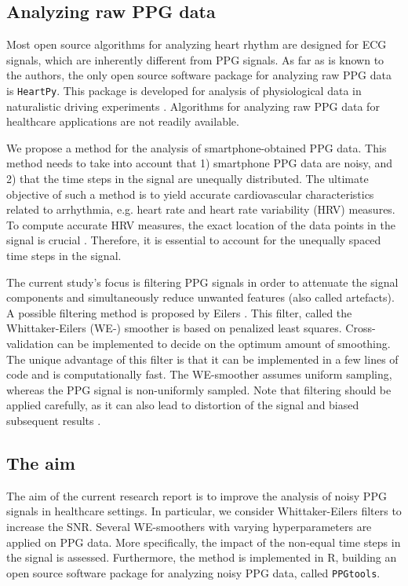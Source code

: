 \documentclass[twocolumn]{bmcart}%
\begin{document}
\subsection*{Analyzing raw PPG data}
Most open source algorithms for analyzing heart rhythm are designed for ECG signals, which are inherently different from PPG signals. 
As far as is known to the authors, the only open source software package for analyzing raw PPG data is \texttt{HeartPy}. 
This package is developed for analysis of physiological data in naturalistic driving experiments \cite{vanGent2019}. 
Algorithms for analyzing raw PPG data for healthcare applications are not readily available. 

We propose a method for the analysis of smartphone-obtained PPG data. 
This method needs to take into account that 1) smartphone PPG data are noisy,
and 2) that the time steps in the signal are unequally distributed. 
The ultimate objective of such a method is to yield accurate cardiovascular characteristics related to arrhythmia, e.g. heart rate and heart rate variability (HRV) measures.  
To compute accurate HRV measures, the exact location of the data points in the signal is crucial \cite{GarciaMartinez2017}.  
Therefore, it is essential to account for the unequally spaced time steps in the signal. 

The current study's focus is filtering PPG signals in order to attenuate the signal components and simultaneously reduce unwanted features (also called artefacts). 
A possible filtering method is proposed by Eilers \cite{Eilers2003}. 
This filter, called the Whittaker-Eilers (WE-) smoother is based on penalized least squares.
Cross-validation can be implemented to decide on the optimum amount of smoothing.
The unique advantage of this filter is that it can be implemented in a few lines of code and is computationally fast. 
The WE-smoother assumes uniform sampling, whereas the PPG signal is non-uniformly sampled.
Note that filtering should be applied carefully, as it can also lead to distortion of the signal and biased subsequent results \cite{Widmann2015}. 

\subsection*{The aim}
The aim of the current research report is to improve the analysis of noisy PPG signals in healthcare settings. 
In particular, we consider Whittaker-Eilers filters to increase the SNR. 
Several WE-smoothers with varying hyperparameters are applied on PPG data. 
More specifically, the impact of the non-equal time steps in the signal is assessed. 
Furthermore, the method is implemented in R, building an open source software package for analyzing noisy PPG data, called \texttt{PPGtools}. 
\end{document}
